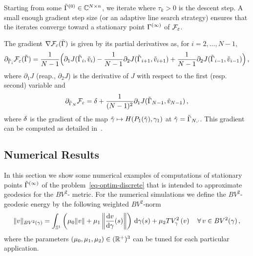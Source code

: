 Starting from some $\tilde{\Gamma}^{(0)} \in \mathbb{C}^{N \times n}$, we iterate 
where $ \tau_k>0$ is the descent step. A small enough gradient step size (or an adaptive line search strategy) ensures that the iterates converge toward a stationary point $\Gamma^{(\infty)}$ of $\mathcal{F}_\varepsilon$. 

The gradient $\nabla \mathcal{F}_\varepsilon(\tilde{\Gamma})$ is given by its partial derivatives as, for $i=2, \ldots ,N-1$, 
$$
	\partial_{\tilde{\Gamma}_i} \mathcal{F}_\varepsilon(\tilde{\Gamma}) = 
	\frac{1}{N-1} \Big(
		\partial_1 J(\tilde{\Gamma}_i, \tilde{v}_i) - 
		\frac{1}{N-1}\partial_2 J(\tilde{\Gamma}_{i+1}, \tilde{v}_{i+1}) +  
		\frac{1}{N-1}\partial_2 J(\tilde{\Gamma}_{i-1}, \tilde{v}_{i-1})
		\Big)  \,,
$$ 
where $\partial_1 J$ (reap., $\partial_2 J$) is the derivative of $J$ with respect to the first (resp. second) variable and 
$$
	\partial_{\tilde{\Gamma}_N} \mathcal{F}_\varepsilon = 
	\delta + \frac{1}{(N-1)^2}\partial_1 J(\tilde{\Gamma}_{N-1}, \tilde{v}_{N-1})\,, 
$$
where $\delta$ is the gradient of the map $\tilde {\gamma} \mapsto H( P_1(\tilde {\gamma}), \gamma_1  )$ at $\tilde{\gamma}=\tilde{\Gamma}_{N,\cdot}$. This gradient can be computed as detailed in~\cite{Rigid-evol}. 


\subsection{Numerical Results}

In this section we show some numerical examples of computations of  stationary points $\tilde{\Gamma}^{(\infty)}$ of the problem~\eqref{eq-optim-discrete} that is intended to approximate geodesics for the $BV^2$- metric. For the numerical simulations we define the $BV^2$-geodesic energy 
by the following weighted $BV^2$-norm
$$\|v\|_{BV^2(\gamma)} = \int_{\mathbb{S}^1}\left( \mu_0\|v\|+ \mu_1 \left\|\frac{\mathrm{d} v}{\mathrm{d} \gamma}(s)\right\|\right)\,\mathrm{d}\gamma(s) + \mu_2 TV_\gamma^2\left(v\right) \quad\forall\, v\in BV^2(\gamma)\,,$$
where the parameters $(\mu_0,\mu_1,\mu_2)\in ({\mathbb R}^+)^3$  can be tuned for each particular application.
 
